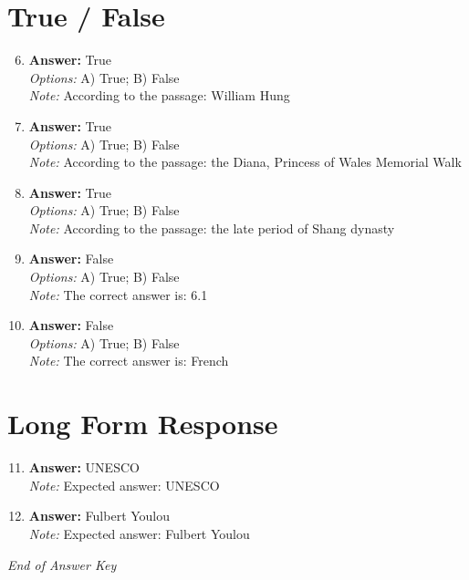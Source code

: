 \documentclass[12pt]{article}
\begin{document}
\section*{True / False}
\begin{enumerate}[label=\arabic*.]
\setcounter{enumi}{5}
\item \textbf{Answer:} True
\\ \textit{Options:} A) True; B) False
\\ \textit{Note:} According to the passage: William Hung
\item \textbf{Answer:} True
\\ \textit{Options:} A) True; B) False
\\ \textit{Note:} According to the passage: the Diana, Princess of Wales Memorial Walk
\item \textbf{Answer:} True
\\ \textit{Options:} A) True; B) False
\\ \textit{Note:} According to the passage: the late period of Shang dynasty
\item \textbf{Answer:} False
\\ \textit{Options:} A) True; B) False
\\ \textit{Note:} The correct answer is: 6.1
\item \textbf{Answer:} False
\\ \textit{Options:} A) True; B) False
\\ \textit{Note:} The correct answer is: French
\end{enumerate}

\section*{Long Form Response}
\begin{enumerate}[label=\arabic*.]
\setcounter{enumi}{10}
\item \textbf{Answer:} UNESCO
\\ \textit{Note:} Expected answer: UNESCO
\item \textbf{Answer:} Fulbert Youlou
\\ \textit{Note:} Expected answer: Fulbert Youlou
\end{enumerate}

\vfill
\noindent\textit{End of Answer Key}
\end{document}
